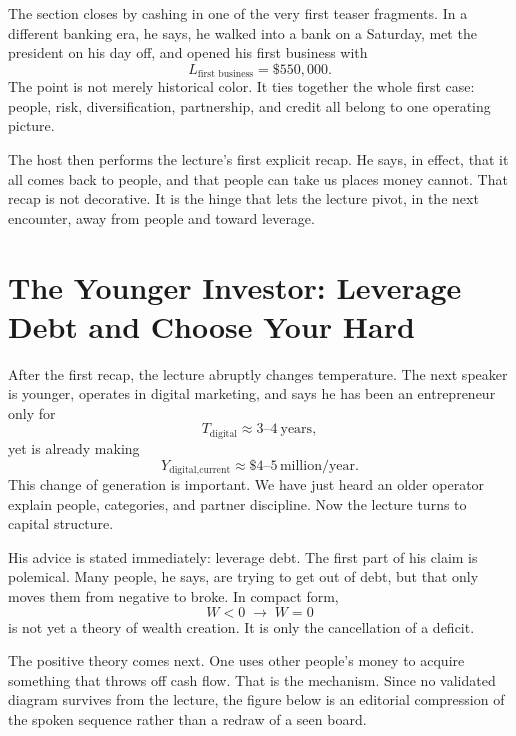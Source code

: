 The section closes by cashing in one of the very first teaser fragments. In a different banking era, he says, he walked into a bank on a Saturday, met the president on his day off, and opened his first business with
\begin{equation}
L_{\text{first business}} = \$550{,}000.
\end{equation}
The point is not merely historical color. It ties together the whole first case: people, risk, diversification, partnership, and credit all belong to one operating picture.

The host then performs the lecture's first explicit recap. He says, in effect, that it all comes back to people, and that people can take us places money cannot. That recap is not decorative. It is the hinge that lets the lecture pivot, in the next encounter, away from people and toward leverage.

\section{The Younger Investor: Leverage Debt and Choose Your Hard}

After the first recap, the lecture abruptly changes temperature. The next speaker is younger, operates in digital marketing, and says he has been an entrepreneur only for
\begin{equation}
T_{\text{digital}} \approx 3\text{--}4\ \text{years},
\end{equation}
yet is already making
\begin{equation}
Y_{\text{digital,current}} \approx \$4\text{--}5\,\text{million/year}.
\end{equation}
This change of generation is important. We have just heard an older operator explain people, categories, and partner discipline. Now the lecture turns to capital structure.

His advice is stated immediately: leverage debt. The first part of his claim is polemical. Many people, he says, are trying to get out of debt, but that only moves them from negative to broke. In compact form,
\begin{equation}
W<0 \;\to\; W=0
\end{equation}
is not yet a theory of wealth creation. It is only the cancellation of a deficit.

The positive theory comes next. One uses other people's money to acquire something that throws off cash flow. That is the mechanism. Since no validated diagram survives from the lecture, the figure below is an editorial compression of the spoken sequence rather than a redraw of a seen board.

